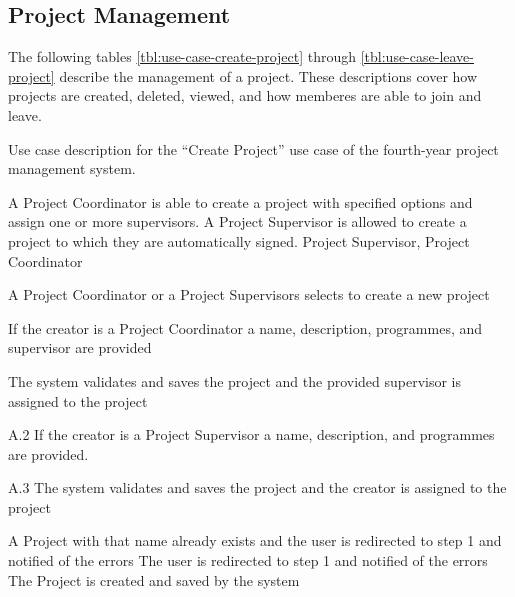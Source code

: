 \FloatBarrier

\subsection{Project Management}
\label{sec:project-management}

The following tables \ref{tbl:use-case-create-project} through \ref{tbl:use-case-leave-project} describe the management of a project. These descriptions cover how projects are created, deleted, viewed, and how memberes are able to join and leave.


\begin{table}
  \centering
  \caption{Use case description for the ``Create Project'' use case of the fourth-year project management system.}
  \label{tbl:use-case-create-project}

  \begin{usecase}
    A Project Coordinator is able to create a project with specified options and assign one or more supervisors. A Project Supervisor is allowed to create a project to which they are automatically signed.
    Project Supervisor, Project Coordinator
    \ucnormal
    \begin{ucenum}
      \item A Project Coordinator or a Project Supervisors selects to create a new project
      \item If the creator is a Project Coordinator a name, description, programmes, and supervisor are provided
      \item The system validates and saves the project and the provided supervisor is assigned to the project
    \end{ucenum}
    \begin{ucenum}
      \item [A.2] If the creator is a Project Supervisor a name, description, and programmes are provided.
      \item [A.3] The system validates and saves the project and the creator is assigned to the project
    \end{ucenum}
    A Project with that name already exists and the user is redirected to step 1 and notified of the errors
    The user is redirected to step 1 and notified of the errors
    The Project is created and saved by the system
  \end{usecase}
\end{table}



